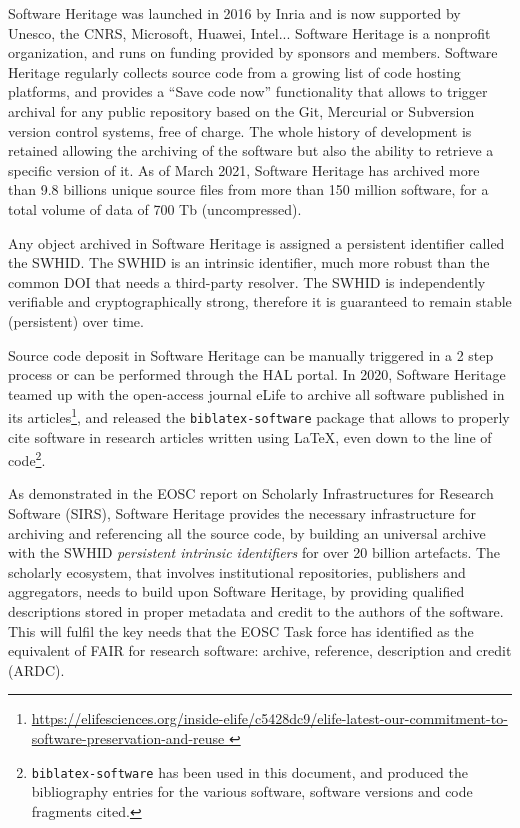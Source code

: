 \documentclass[long, final]{jobim}
\begin{document}
Software Heritage was launched in 2016 by Inria and is now supported by Unesco, the CNRS, Microsoft, Huawei, Intel... Software Heritage is a nonprofit organization, and runs on funding provided by sponsors and members. Software Heritage regularly collects source code from a growing list of code hosting platforms, and provides a “Save code now” functionality that allows to trigger archival for any public repository based on the Git, Mercurial or Subversion version control systems, free of charge. The whole history of development is retained allowing the archiving of the software but also the ability to retrieve a specific version of it. As of March 2021, Software Heritage has archived more than 9.8 billions unique source files from more than 150 million software, for a total volume of data of 700 Tb (uncompressed).

Any object archived in Software Heritage is assigned a persistent identifier called the SWHID\cite{dicosmo2020}. The SWHID is an intrinsic identifier, much more robust than the common DOI that needs a third-party resolver. The SWHID is independently verifiable and cryptographically strong, therefore it is guaranteed to remain stable (persistent) over time.

Source code deposit in Software Heritage can be manually triggered in a 2 step process or can be performed through the HAL portal\cite{barborini2018}. In 2020, Software Heritage teamed up with the open-access journal eLife to archive all software published in its articles\footnote{\url{https://elifesciences.org/inside-elife/c5428dc9/elife-latest-our-commitment-to-software-preservation-and-reuse }}, and released the \texttt{biblatex-software} package\cite{biblatex-software} that allows to properly cite software in research articles written using LaTeX, even down to the line of code\cite{dicosmo2020}\footnote{\texttt{biblatex-software} has been used in this document, and produced the bibliography entries for the various software, software versions and code fragments cited.}.

As demonstrated in the EOSC report on Scholarly Infrastructures for Research Software (SIRS)\cite{SIRSReport2020}, Software Heritage provides the necessary infrastructure for archiving and referencing all the source code, by building an universal archive with the SWHID \textit{persistent intrinsic identifiers} for over 20 billion artefacts. The scholarly ecosystem, that involves institutional repositories, publishers and aggregators, needs to build upon Software Heritage, by providing qualified descriptions stored in proper metadata and credit to the authors of the software. This will fulfil the key needs that the EOSC Task force has identified as the equivalent of FAIR for research software: archive, reference, description and credit (ARDC). 
\end{document}
